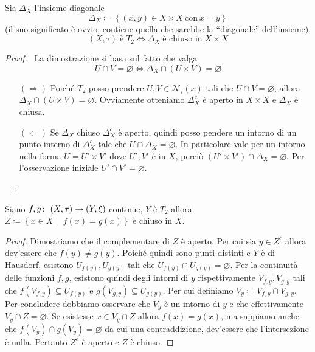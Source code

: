 \begin{theorem} Sia $\Delta_{X}$ l'insieme diagonale 
	\begin{equation*}
	\Delta_{X} \coloneqq \left\{(x,y)\in X \times X \ \text{con} \ x=y\right\}
	\end{equation*}
	(il suo significato è ovvio, contiene quella che sarebbe la \enquote{diagonale} dell'insieme).
	\begin{equation*}
	(X, \tau) \; \text{è} \; T_2 \Leftrightarrow \Delta_{X} \; \text{è chiuso in} \; X \times X
	\end{equation*}
\end{theorem} 
\begin{proof} \
	La dimostrazione si basa sul fatto che valga 
	\begin{equation*}
	U \cap V = \varnothing \Leftrightarrow \Delta_X \cap (U \times V) = \varnothing
	\end{equation*}
	\begin{enumerate}
		\item[$(\Rightarrow)$] Poiché $T_2$ posso prendere $U, V \in \mathcal{N}_\tau(x)$ tali che $U \cap V = \varnothing$, allora $\Delta_X \cap (U \times V) = \varnothing$. Ovviamente otteniamo $\Delta_X^c$ è aperto in $X\times X$ e $\Delta_X$ è chiusa. 
		\item[$(\Leftarrow)$] Se $\Delta_X$ chiuso $\Delta^c_X$ è aperto, quindi posso pendere un intorno di un punto interno di $\Delta^c_X$ tale che $U \cap \Delta_X = \varnothing$. In particolare vale per un intorno nella forma $U = U' \times V'$ dove $U', V'$ è in $X$, perciò $(U' \times V') \cap \Delta_X = \varnothing$. Per l'osservazione iniziale $U' \cap V' = \varnothing$.
	\end{enumerate}
\end{proof}

\begin{theorem}
	Siano $f,g \colon\ (X,\tau) \rightarrow (Y,\xi)$ continue, $Y$ è $T_2$ allora $Z \coloneqq \left\{x \in X \,\middle|\, f(x) = g(x) \right\}$ è chiuso in $X$.
\end{theorem}
\begin{proof}
	Dimostriamo che il complementare di $Z$ è aperto. Per cui sia $y \in Z^c$ allora dev'essere che $f(y) \neq g(y)$. Poiché quindi sono punti distinti e $Y$ è di Hausdorf, esistono $U_{f(y)}, U_{g(y)}$ tali che $U_{f(y)} \cap U_{g(y)} = \varnothing$. Per la continuità delle funzioni $f,g$, esistono quindi degli intorni di $y$ rispettivamente $V_{f,y}, V_{g,y}$ tali che $f(V_{f,y}) \subseteq U_{f(y)}$ e $g(V_{g,y}) \subseteq U_{g(y)}$. Per cui definiamo $V_y \coloneqq V_{f,y} \cap V_{g,y}$. Per concludere dobbiamo osservare che $V_y$ è un intorno di $y$ e che effettivamente $V_y \cap Z = \varnothing$. Se esistesse $x \in V_y \cap Z$ allora $f(x) = g(x)$, ma sappiamo anche che $f(V_y) \cap g(V_y) = \varnothing$ da cui una contraddizione, dev'essere che l'intersezione è nulla. Pertanto $Z^c$ è aperto e $Z$ è chiuso.
\end{proof}



